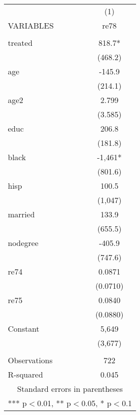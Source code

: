 \begin{tabular}{lc} \hline
 & (1) \\
VARIABLES & re78 \\ \hline
 &  \\
treated & 818.7* \\
 & (468.2) \\
age & -145.9 \\
 & (214.1) \\
age2 & 2.799 \\
 & (3.585) \\
educ & 206.8 \\
 & (181.8) \\
black & -1,461* \\
 & (801.6) \\
hisp & 100.5 \\
 & (1,047) \\
married & 133.9 \\
 & (655.5) \\
nodegree & -405.9 \\
 & (747.6) \\
re74 & 0.0871 \\
 & (0.0710) \\
re75 & 0.0840 \\
 & (0.0880) \\
Constant & 5,649 \\
 & (3,677) \\
 &  \\
Observations & 722 \\
 R-squared & 0.045 \\ \hline
\multicolumn{2}{c}{ Standard errors in parentheses} \\
\multicolumn{2}{c}{ *** p$<$0.01, ** p$<$0.05, * p$<$0.1} \\
\end{tabular}
